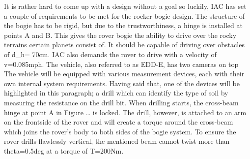 It is rather hard to come up with a design without a goal so luckily, IAC has set a couple of requirements to be met for the rocker bogie design. The structure of the bogie has to be rigid, but due to the trustworthiness, a hinge is  installed at points A and B. This gives the rover bogie the ability to drive over the rocky terrains certain planets consist of. It should be capable of driving over obstacles of d_h= 70cm. IAC also demands the rover to drive with a velocity of v=0.085mph. The vehicle, also referred to as EDD-E, has two cameras on top 
The vehicle will be equipped with various measurement devices, each with their own internal system requirements. Having said that, one of the devices will be highlighted in this paragraph; a drill which can identify the type of soil by measuring the resistance on the drill bit. When drilling starts, the cross-beam hinge at point A in Figure … is locked. The drill, however, is attached to an arm on the frontside of the rover and will create a torque around the cross-beam which joins the rover’s body to both sides of the bogie system. To ensure the rover drills flawlessly vertical, the mentioned beam cannot twist more than theta=0.5deg at a torque of T=200Nm. 


